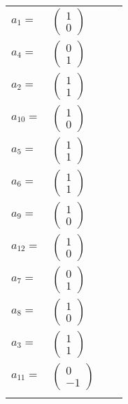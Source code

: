 \documentclass[1p]{elsarticle_modified}
\theoremstyle{definition}
\begin{document}
\begin{tabular}{m{7pt} m{180pt} m{7pt} m{180pt} }
\flushright $a_{1}=$&$\begin{pmatrix}1\\0\end{pmatrix}$ \\
\flushright $a_{4}=$&$\begin{pmatrix}0\\1\end{pmatrix}$ \\
\flushright $a_{2}=$&$\begin{pmatrix}1\\1\end{pmatrix}$ \\
\flushright $a_{10}=$&$\begin{pmatrix}1\\0\end{pmatrix}$ \\
\flushright $a_{5}=$&$\begin{pmatrix}1\\1\end{pmatrix}$ \\
\flushright $a_{6}=$&$\begin{pmatrix}1\\1\end{pmatrix}$ \\
\flushright $a_{9}=$&$\begin{pmatrix}1\\0\end{pmatrix}$ \\
\flushright $a_{12}=$&$\begin{pmatrix}1\\0\end{pmatrix}$ \\
\flushright $a_{7}=$&$\begin{pmatrix}0\\1\end{pmatrix}$ \\
\flushright $a_{8}=$&$\begin{pmatrix}1\\0\end{pmatrix}$ \\
\flushright $a_{3}=$&$\begin{pmatrix}1\\1\end{pmatrix}$ \\
\flushright $a_{11}=$&$\begin{pmatrix}0\\-1\end{pmatrix}$\\&\end{tabular}
\end{document}
